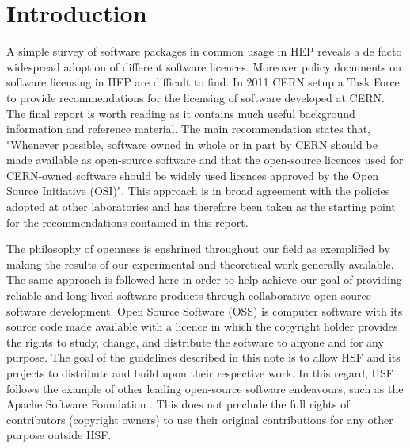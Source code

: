 \documentclass[12pt,a4paper]{article}
\begin{document}

\cleardoublepage

\renewcommand{\thefootnote}{\arabic{footnote}}
\setcounter{footnote}{0}


\pagestyle{plain} %
\setcounter{page}{1}

\linenumbers

\section{Introduction}
\label{sec:Introduction}

A simple survey of software packages in common usage in HEP reveals a de facto widespread adoption of different software licences. Moreover policy documents on software licensing in HEP are difficult to find. In 2011 CERN setup a Task Force to provide recommendations for the licensing of software developed at CERN. The final report \cite{[1]} is worth reading as it contains much useful background information and reference material. The main recommendation states that, "Whenever possible, software owned in whole or in part by CERN should be made available as open-source software and that the open-source licences used for CERN-owned software should be widely used licences approved by the Open Source Initiative (OSI)". This approach is in broad agreement with the policies adopted at other laboratories and has therefore been taken as the starting point for the recommendations contained in this report.

The philosophy of openness is enshrined throughout our field as exemplified by making the results of our experimental and theoretical work generally available. The same approach is followed here in order to help achieve our goal of providing reliable and long-lived software products through collaborative open-source software development.  Open Source Software (OSS) is computer software with its source code made available with a licence in which the copyright holder provides the rights to study, change, and distribute the software to anyone and for any purpose. The goal of the guidelines described in this note is to allow HSF and its projects to distribute and build upon their respective work. In this regard, HSF follows the example of other leading open-source software endeavours, such as the Apache Software Foundation \cite{[2]}. This does not preclude the full rights of contributors (copyright owners) to use their original contributions for any other purpose outside HSF.
\end{document}
